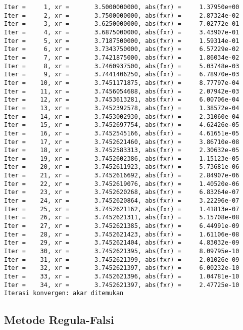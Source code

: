 \documentclass[11pt]{article}
\begin{document}
    \begin{Verbatim}[commandchars=\\\{\}]
Iter =     1, xr =       3.5000000000, abs(fxr) =     1.37950e+00
Iter =     2, xr =       3.7500000000, abs(fxr) =     2.87324e-02
Iter =     3, xr =       3.6250000000, abs(fxr) =     7.02772e-01
Iter =     4, xr =       3.6875000000, abs(fxr) =     3.43907e-01
Iter =     5, xr =       3.7187500000, abs(fxr) =     1.59314e-01
Iter =     6, xr =       3.7343750000, abs(fxr) =     6.57229e-02
Iter =     7, xr =       3.7421875000, abs(fxr) =     1.86034e-02
Iter =     8, xr =       3.7460937500, abs(fxr) =     5.03748e-03
Iter =     9, xr =       3.7441406250, abs(fxr) =     6.78970e-03
Iter =    10, xr =       3.7451171875, abs(fxr) =     8.77797e-04
Iter =    11, xr =       3.7456054688, abs(fxr) =     2.07942e-03
Iter =    12, xr =       3.7453613281, abs(fxr) =     6.00706e-04
Iter =    13, xr =       3.7452392578, abs(fxr) =     1.38572e-04
Iter =    14, xr =       3.7453002930, abs(fxr) =     2.31060e-04
Iter =    15, xr =       3.7452697754, abs(fxr) =     4.62426e-05
Iter =    16, xr =       3.7452545166, abs(fxr) =     4.61651e-05
Iter =    17, xr =       3.7452621460, abs(fxr) =     3.86710e-08
Iter =    18, xr =       3.7452583313, abs(fxr) =     2.30632e-05
Iter =    19, xr =       3.7452602386, abs(fxr) =     1.15123e-05
Iter =    20, xr =       3.7452611923, abs(fxr) =     5.73681e-06
Iter =    21, xr =       3.7452616692, abs(fxr) =     2.84907e-06
Iter =    22, xr =       3.7452619076, abs(fxr) =     1.40520e-06
Iter =    23, xr =       3.7452620268, abs(fxr) =     6.83264e-07
Iter =    24, xr =       3.7452620864, abs(fxr) =     3.22296e-07
Iter =    25, xr =       3.7452621162, abs(fxr) =     1.41813e-07
Iter =    26, xr =       3.7452621311, abs(fxr) =     5.15708e-08
Iter =    27, xr =       3.7452621385, abs(fxr) =     6.44991e-09
Iter =    28, xr =       3.7452621423, abs(fxr) =     1.61106e-08
Iter =    29, xr =       3.7452621404, abs(fxr) =     4.83032e-09
Iter =    30, xr =       3.7452621395, abs(fxr) =     8.09795e-10
Iter =    31, xr =       3.7452621399, abs(fxr) =     2.01026e-09
Iter =    32, xr =       3.7452621397, abs(fxr) =     6.00232e-10
Iter =    33, xr =       3.7452621396, abs(fxr) =     1.04781e-10
Iter =    34, xr =       3.7452621397, abs(fxr) =     2.47725e-10
Iterasi konvergen: akar ditemukan
    \end{Verbatim}

    \hypertarget{metode-regula-falsi}{%
\subsection{Metode Regula-Falsi}\label{metode-regula-falsi}}
\end{document}
